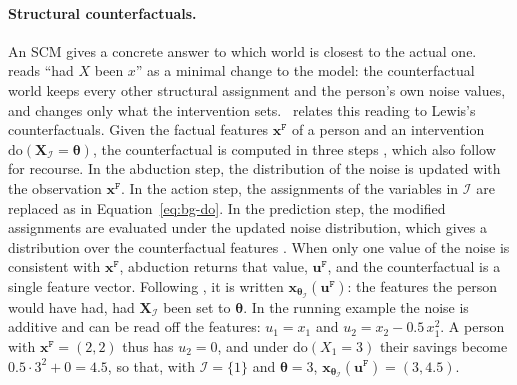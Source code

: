 \paragraph{Structural counterfactuals.}
An SCM gives a concrete answer to which world is closest to the actual one.
\citet[Sec.~3.4]{pearl2009overview} reads ``had $X$ been $x$'' as a minimal change to the model:
the counterfactual world keeps every other structural assignment and the person's own noise values,
and changes only what the intervention sets.~\citet[Sec.~7.4.1]{pearl2009causality} relates this
reading to Lewis's counterfactuals. Given the factual features $\mathbf{x}^{\mathtt{F}}$ of a person
and an intervention $\mathrm{do}(\mathbf{X}_{\mathcal{I}} = \boldsymbol{\theta})$, the
counterfactual is computed in three steps \citep[Thm.~7.1.7]{pearl2009causality}, which
\citet{vonkugelgen2022fairness} also follow for recourse. In the abduction step, the distribution
of the noise is updated with the observation $\mathbf{x}^{\mathtt{F}}$. In the action step, the
assignments of the variables in $\mathcal{I}$ are replaced as in Equation~\ref{eq:bg-do}. In the
prediction step, the modified assignments are evaluated under the updated noise distribution, which
gives a distribution over the counterfactual features \citep[Sec.~7.1.3]{pearl2009causality}. When
only one value of the noise is consistent with $\mathbf{x}^{\mathtt{F}}$, abduction returns that
value, $\mathbf{u}^{\mathtt{F}}$, and the counterfactual is a single feature vector. Following \citet{vonkugelgen2022fairness}, it is written
$\mathbf{x}_{\boldsymbol{\theta}_{\mathcal{I}}}(\mathbf{u}^{\mathtt{F}})$: the features the person
would have had, had $\mathbf{X}_{\mathcal{I}}$ been set to $\boldsymbol{\theta}$.
In the running example the noise is additive and can be read off the
features: $u_1 = x_1$ and $u_2 = x_2 - 0.5\,x_1^2$. A person with $\mathbf{x}^{\mathtt{F}} = (2, 2)$
thus has $u_2 = 0$, and under $\mathrm{do}(X_1 = 3)$ their savings become $0.5 \cdot 3^2 + 0 = 4.5$,
so that, with $\mathcal{I} = \{1\}$ and $\boldsymbol{\theta} = 3$,
$\mathbf{x}_{\boldsymbol{\theta}_{\mathcal{I}}}(\mathbf{u}^{\mathtt{F}}) = (3, 4.5)$. 

